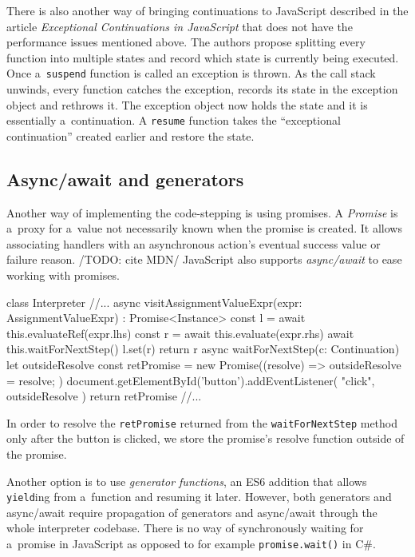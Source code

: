 There is also another way of bringing continuations to JavaScript described in the article \emph{Exceptional Continuations in JavaScript}
\cite{ExceptionalContinuations} that does not have the performance issues mentioned above. The authors propose splitting every function into
multiple states and record which state is currently being executed. Once a~\texttt{suspend} function is called an exception is thrown. As
the call stack unwinds, every function catches the exception, records its state in the exception object and rethrows it. The exception object
now holds the state and it is essentially a~continuation. A \texttt{resume} function takes the ``exceptional continuation'' created earlier and restore the state.

\subsection*{Async/await and generators}
Another way of implementing the code-stepping is using promises. A \emph{Promise} is a~proxy for a~value not necessarily known when the promise is created.
It allows associating handlers with an asynchronous action's eventual success value or failure reason. /TODO: cite MDN/ JavaScript also supports \emph{async/await}
to ease working with promises.
\begin{code}
class Interpreter {
    //...
    async visitAssignmentValueExpr(expr: AssignmentValueExpr)
        : Promise<Instance> {
        const l = await this.evaluateRef(expr.lhs)
        const r = await this.evaluate(expr.rhs)
        await this.waitForNextStep()
        l.set(r)
        return r
    }
    async waitForNextStep(c: Continuation) {
        let outsideResolve
        const retPromise = new Promise((resolve) => { 
            outsideResolve = resolve; 
        })
        document.getElementById('button').addEventListener(
            "click",
            outsideResolve
        )
        return retPromise
    }
    //...
}
\end{code}
In order to resolve the \texttt{retPromise} returned from the \texttt{waitForNextStep} method only after the button is clicked, we store the promise's resolve
function outside of the promise.

Another option is to use \emph{generator functions}, an ES6 addition that allows \texttt{yield}ing from a~function and resuming it later. However, both generators
and async/await require propagation of generators and async/await through the whole interpreter codebase. There is no way of synchronously waiting for a~promise
in JavaScript as opposed to for example \texttt{promise.wait()} in C\#.
 
